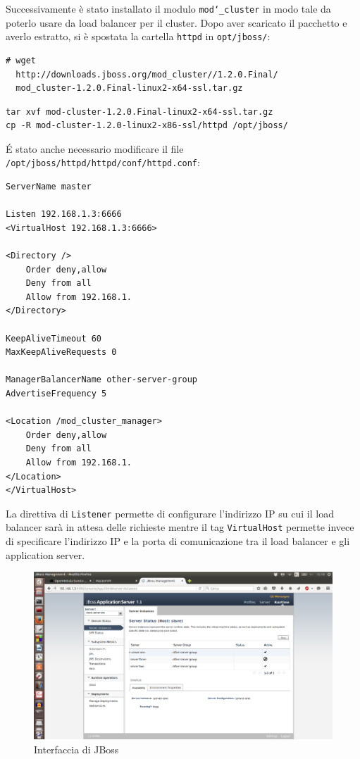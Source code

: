 \documentclass[twoside]{article}
\begin{document}
Successivamente è stato installato il modulo \texttt{mod\char`_cluster} in modo tale da poterlo
usare da load balancer per il cluster. Dopo aver scaricato il pacchetto e averlo estratto,
si è spostata la cartella \texttt{httpd} in \texttt{opt/jboss/}:
\begin{lstlisting}[frame=trBL]
# wget
  http://downloads.jboss.org/mod_cluster//1.2.0.Final/
  mod_cluster-1.2.0.Final-linux2-x64-ssl.tar.gz
\end{lstlisting}
\begin{lstlisting}[frame=trBL]
tar xvf mod-cluster-1.2.0.Final-linux2-x64-ssl.tar.gz
cp -R mod-cluster-1.2.0-linux2-x86-ssl/httpd /opt/jboss/
\end{lstlisting}
\'{E} stato anche necessario modificare il file \texttt{/opt/jboss/httpd/httpd/conf/httpd.conf}:
\begin{lstlisting}[frame=trBL]
ServerName master

Listen 192.168.1.3:6666
<VirtualHost 192.168.1.3:6666>

<Directory />
	Order deny,allow
	Deny from all
	Allow from 192.168.1.
</Directory>

KeepAliveTimeout 60
MaxKeepAliveRequests 0

ManagerBalancerName other-server-group
AdvertiseFrequency 5

<Location /mod_cluster_manager>
	Order deny,allow
	Deny from all
	Allow from 192.168.1.
</Location>
</VirtualHost>
\end{lstlisting}
La direttiva di \texttt{Listener} permette di configurare l'indirizzo IP su cui il load balancer sarà
in attesa delle richieste mentre il tag \texttt{VirtualHost} permette invece di specificare l’indirizzo IP e
la porta di comunicazione tra il load balancer e gli application server.

\begin{figure}[!bp]
\centering
\includegraphics[width=13cm]{immagine1.png}
\caption{Interfaccia di JBoss}\label{fig:1}
\end{figure}
\end{document}
